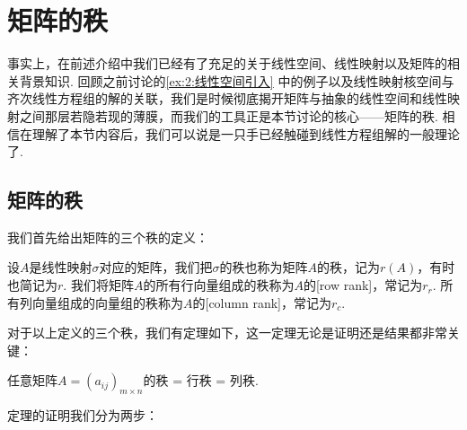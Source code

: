 \chapter{矩阵的秩}

事实上，在前述介绍中我们已经有了充足的关于线性空间、线性映射以及矩阵的相关背景知识. 回顾之前讨论的\autoref{ex:2:线性空间引入} 中的例子以及线性映射核空间与齐次线性方程组的解的关联，我们是时候彻底揭开矩阵与抽象的线性空间和线性映射之间那层若隐若现的薄膜，而我们的工具正是本节讨论的核心——矩阵的秩. 相信在理解了本节内容后，我们可以说是一只手已经触碰到线性方程组解的一般理论了.

\section{矩阵的秩}

我们首先给出矩阵的三个秩的定义：
\begin{definition}
    设$A$是线性映射$\sigma$对应的矩阵，我们把$\sigma$的秩也称为矩阵$A$的秩，记为$r(A)$，有时也简记为$r$. 我们将矩阵$A$的所有行向量组成的秩称为$A$的[row rank]，常记为$r_r$. 所有列向量组成的向量组的秩称为$A$的[column rank]，常记为$r_c$.
\end{definition}
对于以上定义的三个秩，我们有定理如下，这一定理无论是证明还是结果都非常关键：
\begin{theorem}
    任意矩阵$A=(a_{ij})_{m\times n}$的秩 = 行秩 = 列秩.
\end{theorem}
定理的证明我们分为两步：
